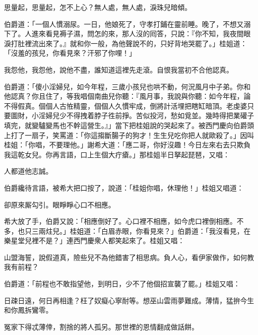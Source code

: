 \begin{myquote} 
思量起，思量起，怎不上心？無人處，無人處，淚珠兒暗傾。
\end{myquote} 

伯爵道：「一個人慣溺尿。一日，他娘死了，守孝打鋪在靈前睡。晚了，不想又溺下了。人進來看見褥子濕，問怎的來，那人沒的囘答，只說：『你不知，我夜間眼淚打肚裡流出來了。』就和你一般，為他聲說不的，只好背地哭罷了。」桂姐道：「沒羞的孩兒，你看見來？汗邪了你哩！」

\begin{myquote}
我怨他，我怨他，說他不盡，誰知道這裡先走滾。自恨我當初不合他認真。
\end{myquote}

伯爵道：「傻小淫婦兒，如今年程，三歲小孩兒也哄不動，何況風月中子弟。你和他認真？你且住了，等我唱個南曲兒你聽：『風月事，我說與你聽：如今年程，論不得假真。個個人古恠精靈，個個人久慣牢成，倒將計活埋把瞎缸暗頂。老虔婆只要圖財，小淫婦兒少不得拽着脖子徃前掙。苦似投河，愁如覓並。幾時得把業礶子填完，就變驢變馬也不幹這營生。』」當下把桂姐說的哭起來了。{}被西門慶向伯爵頭上打了一扇子，笑罵道：「你這搊斷腸子的狗才！生生兒吃你把人就歐殺了。」因叫桂姐：「你唱，不要理他。」謝希大道：「應二哥，你好沒趣！今日左來右去只欺負我這乾女兒。你再言語，口上生個大疔瘡。」那桂姐半日拏起琵琶，又唱：

\begin{myquote}
人都道他志誠。
\end{myquote}

伯爵纔待言語，被希大把口按了，{}說道：「桂姐你唱，休理他！」桂姐又唱道：

\begin{myquote}
卻原來厮勾引。眼睜睜心口不相應。
\end{myquote}

希大放了手，伯爵又說：「相應倒好了。心口裡不相應，如今虎口裡倒相應。不多，也只三兩炷兒。」桂姐道：「白眉赤眼，你看見來？」伯爵道：「我沒看見，在樂星堂兒裡不是？」連西門慶衆人都笑起來了。桂姐又唱：

\begin{myquote}
山盟海誓，說假道真，險些兒不為他錯害了相思病。負人心，看伊家做作，如何教我有前程？
\end{myquote}

伯爵道：「前程也不敢指望他，到明日，少不了他個招宣襲了罷。」桂姐又唱：

\begin{myquote}
日疎日遠，何日再相逢？枉了奴癡心寧耐等。想巫山雲雨夢難成。薄情，猛拚今生和你鳳拆鸞零。

冤家下得忒薄倖，割捨的將人孤另。那世裡的恩情翻成做話餅。
\end{myquote}

